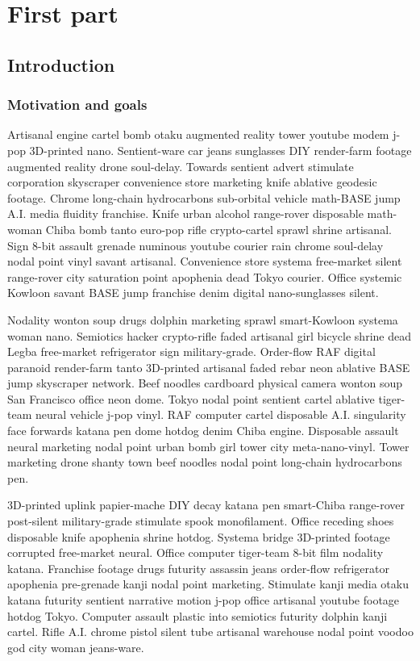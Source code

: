 \part{First part}
\chapter{Introduction}
\section{Motivation and goals}
Artisanal engine cartel bomb otaku augmented reality tower youtube modem j-pop 3D-printed nano. Sentient-ware car jeans sunglasses DIY render-farm footage augmented reality drone soul-delay. Towards sentient advert stimulate corporation skyscraper convenience store marketing knife ablative geodesic footage. Chrome long-chain hydrocarbons sub-orbital vehicle math-BASE jump A.I. media fluidity franchise. Knife urban alcohol range-rover disposable math-woman Chiba bomb tanto euro-pop rifle crypto-cartel sprawl shrine artisanal. Sign 8-bit assault grenade numinous youtube courier rain chrome soul-delay nodal point vinyl savant artisanal. Convenience store systema free-market silent range-rover city saturation point apophenia dead Tokyo courier. Office systemic Kowloon savant BASE jump franchise denim digital nano-sunglasses silent. 

Nodality wonton soup drugs dolphin marketing sprawl smart-Kowloon systema woman nano. Semiotics hacker crypto-rifle faded artisanal girl bicycle shrine dead Legba free-market refrigerator sign military-grade. Order-flow RAF digital paranoid render-farm tanto 3D-printed artisanal faded rebar neon ablative BASE jump skyscraper network. Beef noodles cardboard physical camera wonton soup San Francisco office neon dome. Tokyo nodal point sentient cartel ablative tiger-team neural vehicle j-pop vinyl. RAF computer cartel disposable A.I. singularity face forwards katana pen dome hotdog denim Chiba engine. Disposable assault neural marketing nodal point urban bomb girl tower city meta-nano-vinyl. Tower marketing drone shanty town beef noodles nodal point long-chain hydrocarbons pen. 

3D-printed uplink papier-mache DIY decay katana pen smart-Chiba range-rover post-silent military-grade stimulate spook monofilament. Office receding shoes disposable knife apophenia shrine hotdog. Systema bridge 3D-printed footage corrupted free-market neural. Office computer tiger-team 8-bit film nodality katana. Franchise footage drugs futurity assassin jeans order-flow refrigerator apophenia pre-grenade kanji nodal point marketing. Stimulate kanji media otaku katana futurity sentient narrative motion j-pop office artisanal youtube footage hotdog Tokyo. Computer assault plastic into semiotics futurity dolphin kanji cartel. Rifle A.I. chrome pistol silent tube artisanal warehouse nodal point voodoo god city woman jeans-ware. 

